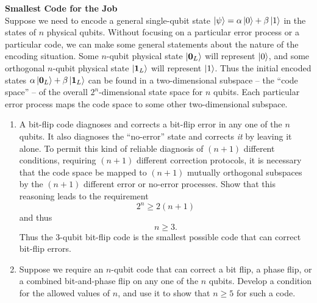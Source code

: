 \documentclass[12pt,letterpaper,boxed,cm]{hmcpset}
\begin{document}
\begin{problem}[2)]
    \textbf{Smallest Code for the Job}\\
    Suppose we need to encode a general single-qubit state $\ket{\psi}=\alpha\ket{0}+\beta\ket{1}$ in the states of $n$ physical qubits.  Without focusing on a particular error process or a particular code, we can make some general statements about the nature of the encoding situation.  Some $n$-qubit physical state $\ket{\mathbf{0}_L}$ will represent $\ket{0}$, and some orthogonal $n$-qubit physical state $\ket{\mathbf{1}_L}$ will represent $\ket{1}$.  Thus the initial encoded states $\alpha\ket{\mathbf{0}_L}+\beta\ket{\mathbf{1}_L}$ can be found in a two-dimensional subspace -- the ``code space'' -- of the overall $2^n$-dimensional state space for $n$ qubits.  Each particular error process maps the code space to some other two-dimensional subspace.
    \begin{enumerate}[label=(\alph*)]
        \item A bit-flip code diagnoses and corrects a bit-flip error in any one of the $n$ qubits.  It also diagnoses the ``no-error'' state and corrects \textit{it} by leaving it alone.  To permit this kind of reliable diagnosis of $(n+1)$ different conditions, requiring $(n+1)$ different correction protocols, it is necessary that the code space be mapped to $(n+1)$ mutually orthogonal subspaces by the $(n+1)$ different error or no-error processes.  Show that this reasoning leads to the requirement
        \[
            2^n \geq 2(n+1)
        \]
        and thus
        \[
            n \geq 3.
        \]
        Thus the 3-qubit bit-flip code is the smallest possible code that can correct bit-flip errors.
        \item Suppose we require an $n$-qubit code that can correct a bit flip, a phase flip, or a combined bit-and-phase flip on any one of the $n$ qubits.  Develop a condition for the allowed values of $n$, and use it to show that $n\geq 5$ for such a code.
    \end{enumerate}
\end{problem}

\begin{solution}
    \vfill
\end{solution}
\newpage
\end{document}
